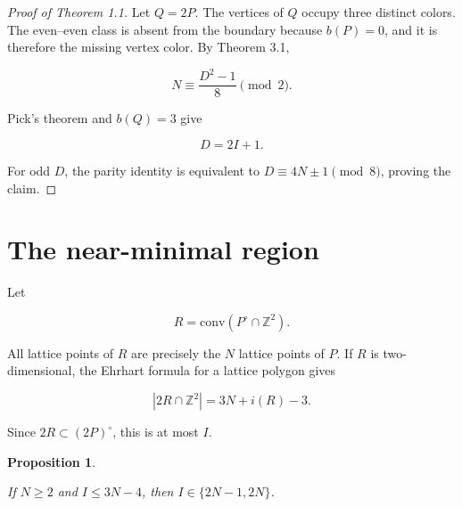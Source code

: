 \documentclass[11pt]{article}
\newtheorem{proposition}[theorem]{Proposition}
\theoremstyle{remark}
\numberwithin{equation}{section}
\begin{document}
\begin{proof}[Proof of Theorem 1.1]

Let $Q=2P$. The vertices of $Q$ occupy three distinct colors. The even--even class is absent from the boundary because $b(P)=0$, and it is therefore the missing vertex color. By Theorem 3.1,

\[
N\equiv\frac{D^2-1}{8}\pmod2.
\]

Pick's theorem and $b(Q)=3$ give

\[
D=2I+1.
\]

For odd $D$, the parity identity is equivalent to $D\equiv4N\pm1\pmod8$, proving the claim.
\end{proof}


\section{The near-minimal region}


Let

\[
R=\mathrm{conv}(P^\circ\cap\mathbb Z^2).
\]

All lattice points of $R$ are precisely the $N$ lattice points of $P$. If $R$ is two-dimensional, the Ehrhart formula for a lattice polygon gives

\[
|2R\cap\mathbb Z^2|=3N+i(R)-3.
\]

Since $2R\subset(2P)^\circ$, this is at most $I$.

\begin{proposition}\label{prop:gap}

If $N\ge2$ and $I\le3N-4$, then $I\in\{2N-1,2N\}$.

\end{proposition}
\end{document}
